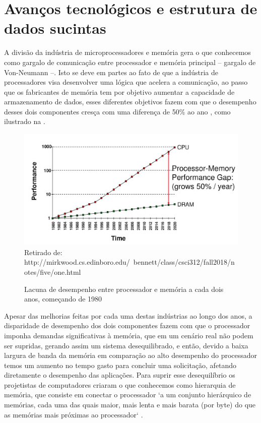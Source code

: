 \section{Avanços tecnológicos e estrutura de dados sucintas}
A divisão da indústria de microprocessadores e memória gera o que conhecemos como  gargalo de comunicação entre processador e  memória principal -- gargalo de Von-Neumann --. Isto se deve em partes ao fato de que a indústria de processadores visa desenvolver uma lógica que acelera a comunicação, ao passo que os fabricantes de memória tem por objetivo aumentar a capacidade de armazenamento de dados, esses diferentes objetivos fazem com que o desempenho desses dois componentes cresça com uma diferença de 50\%  ao ano \citep{paper-processor-memory-bottleneck,paper-gap-between-processor-memory}, como ilustrado na .
\begin{figure}[h!]
\centering
  \caption[Lacuna de desempenho entre processador e memória a cada dois anos, começando de 1980]{Lacuna de desempenho entre processador e memória a cada dois anos, começando de 1980}
  \includegraphics[scale=0.7]{images/gap-processor-memory.png}\\
  \footnotesize{Retirado de: http://mirkwood.cs.edinboro.edu/~bennett/class/csci312/fall2018/notes/five/one.html}
  \label{fig:processor-memory-performance-gap}
\end{figure} 
Apesar das melhorias feitas por cada uma destas indústrias ao longo dos anos, a disparidade de desempenho dos dois componentes fazem com que o processador imponha demandas significativas à memória, que em um cenário real não podem ser supridas, gerando assim um sistema desequilibrado, e então, devido a baixa largura de banda da memória em comparação ao alto desempenho do processador temos um aumento no tempo gasto para concluir uma solicitação, afetando diretamente o desempenho das aplicações. Para suprir esse desequilíbrio os projetistas de computadores criaram o que conhecemos como hierarquia de memória, que consiste em conectar o processador  `a um conjunto hierárquico de memórias, cada uma das quais maior, mais lenta e mais barata (por byte) do que as memórias mais próximas ao processador` \cite[tradução nossa]{paper-gap-between-processor-memory}.

